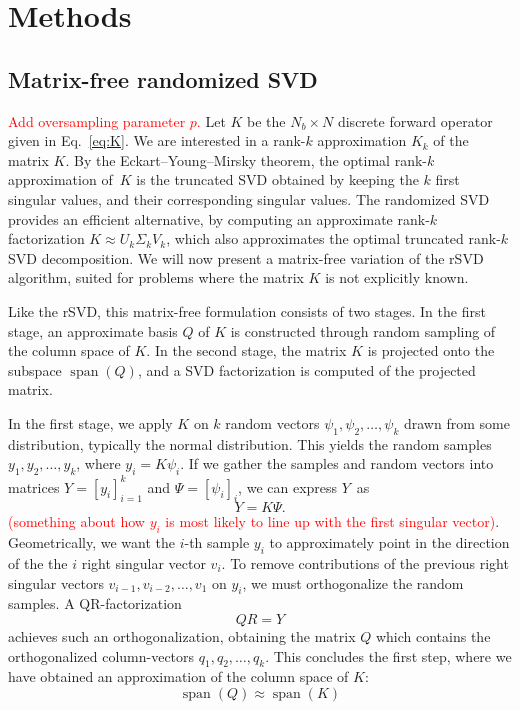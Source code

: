 \section{Methods}

\subsection{Matrix-free randomized SVD}

\textcolor{red}{Add oversampling parameter $p$.}
Let $K$ be the $N_b \times N$ discrete forward operator given in Eq.~\eqref{eq:K}. We are interested in a rank-$k$ approximation $K_k$ of the matrix $K$. By the Eckart–Young–Mirsky theorem, the optimal rank-$k$ approximation of $K$ is the truncated SVD obtained by keeping the $k$ first singular values, and their corresponding singular values. The randomized SVD provides an efficient alternative, by computing an approximate rank-$k$ factorization $K \approx U_k \Sigma_k V_k$, which also approximates the optimal truncated rank-$k$ SVD decomposition. We will now present a matrix-free variation of the rSVD algorithm, suited for problems where the matrix $K$ is not explicitly known.

Like the rSVD, this matrix-free formulation consists of two stages. In the first stage, an approximate basis $Q$ of $K$ is constructed through random sampling of the column space of $K$. In the second stage, the matrix $K$ is projected onto the subspace $\operatorname{span}(Q)$, and a SVD factorization is computed of the projected matrix.

In the first stage, we apply $K$ on $k$ random vectors $\psi_1, \psi_2, \dots, \psi_k$ drawn from some distribution, typically the normal distribution. This yields the random samples $y_1, y_2, \dots, y_k$, where $y_i = K \psi_i$. If we gather the samples and random vectors into matrices $Y = [y_i]_{i=1}^k$ and $\Psi = [\psi_i]_{i}$, we can express $Y$ as
\begin{equation}
    Y = K \Psi.
\end{equation}
\textcolor{red}{(something about how $y_i$ is most likely to line up with the first singular vector)}. Geometrically, we want the $i$-th sample $y_i$ to approximately point in the direction of the the $i$ right singular vector $v_i$. To remove contributions of the previous right singular vectors $v_{i-1}, v_{i-2}, \dots, v_{1}$ on $y_i$, we must orthogonalize the random samples. A QR-factorization
\begin{equation}
    QR = Y
\end{equation}
achieves such an orthogonalization, obtaining the matrix $Q$ which contains the orthogonalized column-vectors $q_1, q_2, \dots, q_k$. This concludes the first step, where we have obtained an approximation of the column space of $K$:
\begin{equation}
    \operatorname{span}(Q) \approx \operatorname{span}(K)
\end{equation}

